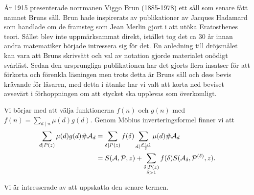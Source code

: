 
År 1915 presenterade norrmanen Viggo Brun (1885-1978) ett såll som senare fått namnet Bruns såll. Brun hade inspirerats av publikationer av Jacques Hadamard som handlade om de framsteg som Jean Merlin gjort i att utöka Eratosthenes teori. Sållet blev inte uppmärksammat direkt, istället tog det ca 30 år innan andra matematiker började intressera sig för det. En anledning till dröjsmålet kan vara att Bruns skrivsätt och val av notation gjorde materialet onödigt svårläst. Sedan den ursprungliga publikationen har det gjorts flera insatser för att förkorta och förenkla läsningen men trots detta är Bruns såll och dess bevis krävande för läsaren, med detta i åtanke har vi valt att korta ned beviset avsevärt i förhoppningen om att stycket ska upplevas som överkomligt.

\bigskip\noindent
Vi börjar med att välja funktionerna $f(n)$ och $g(n)$ med $f(n) = \sum_{d\mid n} \mu(d) g(d)$. Genom Möbius inverteringsformel finner vi att
\begin{align*}
    \sum_{d\mid P(z)} \mu(d) g(d) \# \mathcal{A}_d 
    &= \sum_{\delta\mid P(z)} f(\delta) \sum_{d\mid \frac{P(z)}{\delta}} \mu(d) \# \mathcal{A}_d \\
    &= S(\mathcal{A}, \mathcal{P}, z) + \sum_{\substack{\delta\mid P(z) \\ \delta>1}} f(\delta) S(\mathcal{A_\delta}, \mathcal{P^{(\delta)}}, z).
\end{align*}

Vi är intresserade av att uppskatta den senare termen.